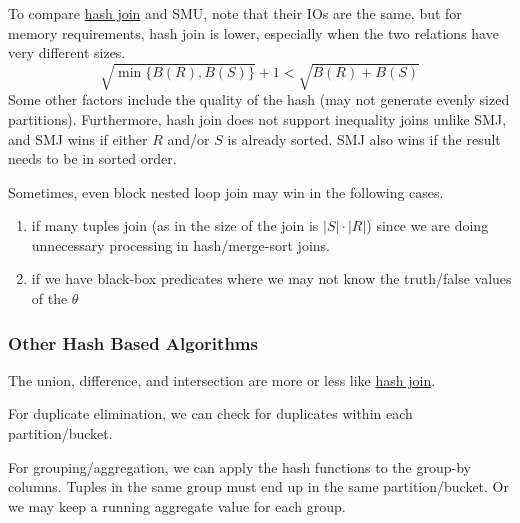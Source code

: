     \begin{theorem}
      \label{thm:hash-vs-sort-merge-join}
      To compare \hyperref[def:hash-join]{hash join} and SMU, note that their IOs are the same, but for memory requirements, hash join is lower, especially when the two relations have very different sizes. 
      \begin{equation}
        \sqrt{\min\{B(R), B(S)\}} + 1 < \sqrt{B(R) + B(S)}
      \end{equation}
      Some other factors include the quality of the hash (may not generate evenly sized partitions). Furthermore, hash join does not support inequality joins unlike SMJ, and SMJ wins if either $R$ and/or $S$ is already sorted. SMJ also wins if the result needs to be in sorted order. 
    \end{theorem}

    Sometimes, even block nested loop join may win in the following cases. 
    \begin{enumerate}
      \item if many tuples join (as in the size of the join is $|S| \cdot |R|$) since we are doing unnecessary processing in hash/merge-sort joins. 
      \item if we have black-box predicates where we may not know the truth/false values of the $\theta$
    \end{enumerate}

  \subsubsection{Other Hash Based Algorithms}

    The union, difference, and intersection are more or less like \hyperref[def:hash-join]{hash join}. 

    For duplicate elimination, we can check for duplicates within each partition/bucket. 

    For grouping/aggregation, we can apply the hash functions to the group-by columns. Tuples in the same group must end up in the same partition/bucket. Or we may keep a running aggregate value for each group. 

